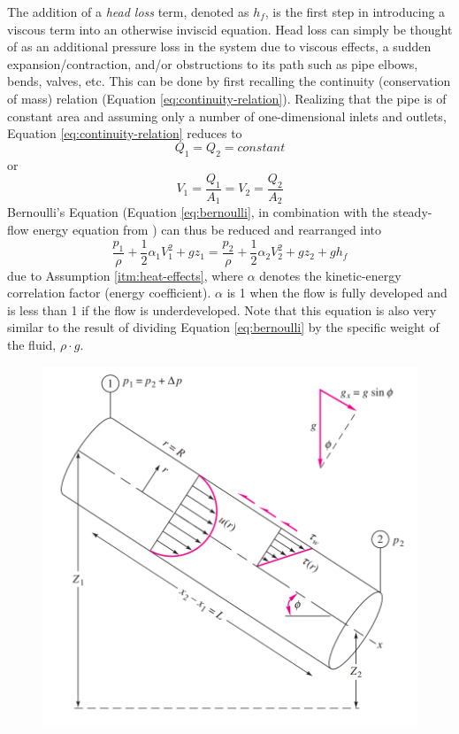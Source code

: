 \documentclass[10pt]{article} %
\numberwithin{equation}{section} %
\begin{document}
\begin{multicols}{2}
The addition of a \textit{head loss} term, denoted as $h_{f}$, is the first step in introducing a viscous term into an otherwise inviscid equation. Head loss can simply be thought of as an additional pressure loss in the system due to viscous effects, a sudden expansion/contraction, and/or obstructions to its path such as pipe elbows, bends, valves, etc. This can be done by first recalling the continuity (conservation of mass) relation (Equation \ref{eq:continuity-relation}). Realizing that the pipe is of constant area and assuming only a number of one-dimensional inlets and outlets, Equation \ref{eq:continuity-relation} reduces to
\begin{equation} \label{eq:equal-q}
Q_{1} = Q_{2} = constant
\end{equation}
or
\begin{equation} \label{eq:equal-v}
V_{1} = \frac{Q_{1}}{A_{1}} = V_{2} = \frac{Q_{2}}{A_{2}}
\end{equation}
Bernoulli's Equation (Equation \ref{eq:bernoulli}, in combination with the steady-flow energy equation from \cite{fluid-mechanics}) can thus be reduced and rearranged into
\begin{equation} \label{eq:steady-flow-energy}
\frac{p_{1}}{\rho} + \frac{1}{2} \alpha_{1} V^{2}_{1} + gz_{1} = \frac{p_{2}}{\rho} + \frac{1}{2} \alpha_{2} V^{2}_{2} + gz_{2} + gh_{f}
\end{equation}
due to Assumption \ref{itm:heat-effects}, where $\alpha$ denotes the kinetic-energy correlation factor (energy coefficient). $\alpha$ is 1 when the flow is fully developed and is less than 1 if the flow is underdeveloped. Note that this equation is also very similar to the result of dividing Equation \ref{eq:bernoulli} by the specific weight of the fluid, $\rho \cdot g$.
\begin{figure}[h]
\centering
\includegraphics[scale=0.45]{inclined_pipe}

\end{figure}
\end{multicols}
\end{document}
